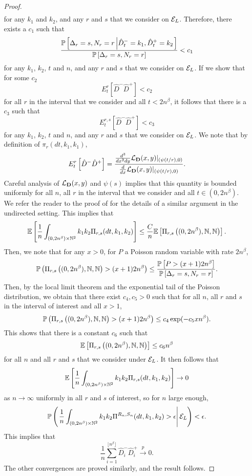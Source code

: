 \begin{proof}
\begin{align*}
\end{align*} for any $k_1$ and $k_2$, and any $r$ and $s$ that we consider on $\cE_L$. Therefore, there exists a $c_1$ such that
$$\frac{\P\left[ \Delta_r=s, N_r=r \left| \hat{D}^-_t=k_1,\hat{D}^+_t=k_2\right.\right]}{\P\left[ \Delta_r=s, N_r=r\right]}<c_1$$
for any $k_1$, $k_2$, $t$ and $n$, and any $r$ and $s$ that we consider on $\cE_L$. If we show that for some $c_2$ $${E}^r_t\left[\hat{D}^-\hat{D}^+\right]<c_2$$ for all $r$ in the interval that we consider and all $t<2n^\beta$, it follows that there is a $c_3$ such that
$${E}^{r,s}_t\left[\hat{D}^-\hat{D}^+\right]<c_3$$ 
for any $k_1$, $k_2$, $t$ and $n$, and any $r$ and $s$ that we consider on $\cE_L$.
We note that by definition of $\pi_r(dt,k_1,k_1)$, 
$${E}^r_t\left[\hat{D}^-\hat{D}^+\right]=\frac{\frac{d^3}{dx^2 dy}\cL_{\mathbf{D}}(x,y)|_{(\psi(t/r),0)}}{\frac{d}{dx}\cL_{\mathbf{D}}(x,y)|_{(\psi(t/r),0)}}.$$
Careful analysis of $\cL_{\mathbf{D}}(x,y)$ and $\psi(s)$ implies that this quantity is bounded uniformly for all $n$, all $r$ in the interval that we consider and all $t\in(0,2n^\beta)$. We refer the reader to the proof of   \cite[Lemma A.1]{josephComponentSizesCritical2014} for the details of a similar argument in the undirected setting.
This implies that 
$$\E\left[\frac{1}{n}\int_{(0,2n^\beta)\times \N^2}k_1k_2 \Pi_{r,s}(dt,k_1,k_2) \right]\leq \frac{C}{n}\E\left[\Pi_{r,s}\left((0,2n^\beta),\N,\N\right)\right].$$
Then, we note that for any $x>0$, for $P$ a Poisson random variable with rate $2n^\beta$,
$$\P\left(\Pi_{r,s}\left((0,2n^\beta),\N,\N\right)>(x+1)2n^\beta\right)\leq \frac{\P\left[P>(x+1)2n^\beta \right]}{\P\left[ \Delta_r=s, N_r=r\right]}.$$
Then, by the local limit theorem and the exponential tail of the Poisson distribution, we obtain that there exist $c_4,c_5>0$ such that for all $n$, all $r$ and $s$ in the interval of interest and all $x>1$,
$$\P\left(\Pi_{r,s}\left((0,2n^\beta),\N,\N\right)>(x+1)2n^\beta\right)\leq c_4\exp(-c_5xn^\beta).$$
This shows that there is a constant $c_6$ such that 
$$\E\left[\Pi_{r,s}\left((0,2n^\beta),\N,\N\right)\right]\leq c_6 n^\beta$$
for all $n$ and all $r$ and $s$ that we consider under $\cE_L$. 
It then follows that 
$$\E\left[\frac{1}{n}\int_{(0,2n^\beta)\times \N^2}k_1k_2 \Pi_{r,s}(dt,k_1,k_2) \right]\to 0$$
as $n\to \infty$ uniformly in all $r$ and $s$ of interest, so for $n$ large enough,
$$\P\left(\left.\frac{1}{n}\int_{(0,2n^\beta)\times \N^2}k_1k_2 \Pi^{R_n,S_n}(dt,k_1,k_2)>\epsilon  \right|\cE_L \right)<\epsilon.$$
This implies that
$$\frac{1}{n}\sum_{i=1}^{\lfloor n^\beta \rfloor}\hat{D}_i^- \hat{D}_i^+\overset{p}{\to}0.$$
The other convergences are proved similarly, and the result follows. 
\end{proof}